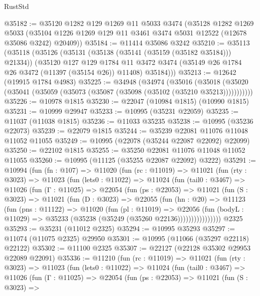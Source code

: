 \begin{lexlean}{RustStd}
\begin{coremodule}
@35182 := @35120
    @1282
    @129
    @1269
    @11
    @5033
    @3474
    (@35128
      @1282
      @1269
      @5033
      (@35104 @1226 @1269 @129 @11 @3461 @3474 @5031 @12522 (@12678 @35086 @3242) @20409))
@35184 := @11414 @35086 @3242
@35210 := @35113
    (@35118
      (@35126
        (@35131 (@35138 (@35141 (@35159 (@35182 @35184))) @21334))
        (@35120
          @127
          @129
          @1784
          @11
          @3472
          @3474
          (@35149 @26 @1784 @26 @3472 (@11397 (@35154 @26)) @11408)
          @35184)))
@35213 := @12642 (@19915 @1784 @4983)
@35225 := @34948
    (@34974
      (@35016
        (@35018 (@35020 (@35041 (@35059 (@35073 (@35087 (@35098 (@35102 (@35210 @35213)))))))))))
@35226 := @10978 @1815
@35230 := @22047 (@10984 @1815) (@10990 @1815)
@35231 := @10999 @29947
@35233 := @10995 (@35231 @22059)
@35235 := @11037 (@11038 @1815)
@35236 := @11033 @35235
@35238 := @10995 (@35236 @22073)
@35239 := @22079 @1815
@35244 := @35239 @22081 @11076 @11048 @11052 @11055
@35249 := @10995 (@22078 (@35244 @22087 @22092) @22099)
@35250 := @22102 @1815
@35255 := @35250 @22081 @11076 @11048 @11052 @11055
@35260 := @10995 (@11125 (@35255 @22087 @22092) @3222)
@35291 := @10994
    (fun (fn : @107) =>
    @11020
      (fun (rc : @11019) =>
      @11021
        (fun (rty : @3023) =>
        @11023
          (fun (lets0 : @11022) =>
          @11024
            (fun (tail0 : @3467) =>
            @11026
              (fun (Γ : @11025) =>
              @22054
                (fun (ps : @22053) =>
                @11021
                  (fun (S : @3023) =>
                  @11021
                    (fun (D : @3023) =>
                    @22055
                      (fun (hn : @20) =>
                      @11123
                        (fun (pns : @11122) =>
                        @11020
                          (fun (pl : @11019) =>
                          @22056
                            (fun (bodyL : @11029) =>
                            @35233 (@35238 (@35249 (@35260 @22136))))))))))))))))
    @2325
@35293 := @35231 (@11012 @2325)
@35294 := @10995 @35293
@35297 := @11074 (@11075 @2325) @29950
@35301 := @10995 (@11066 (@35297 @22118) @22122)
@35302 := @11100 @2325
@35307 := @22127 (@22128 @35302 @29953 @22089 @22091)
@35336 := @11210
    (fun (rc : @11019) =>
    @11021
      (fun (rty : @3023) =>
      @11023
        (fun (lets0 : @11022) =>
        @11024
          (fun (tail0 : @3467) =>
          @11026
            (fun (Γ : @11025) =>
            @22054
              (fun (ps : @22053) =>
              @11021
                (fun (S : @3023) =>

\end{coremodule}
\end{lexlean}
